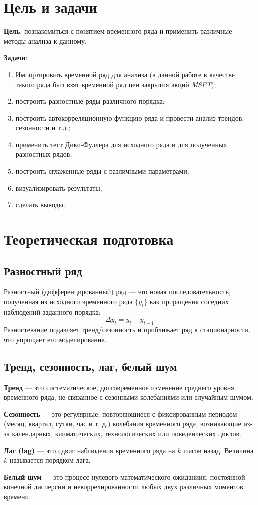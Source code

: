 \documentclass[a4paper, 12pt]{report}
\begin{document}
\section{Цель и задачи}
\textbf{Цель}: познакомиться с понятием временного ряда и применить различные методы анализа к данному. \par
\textbf{Задачи}:
\begin{enumerate}
    \item Импортировать временной ряд для анализа (в данной работе в качестве такого ряда был взят
    временной ряд цен закрытия акций \textit{MSFT});
    \item построить разностные ряды различного порядка;
    \item построить автокорреляционную функцию ряда и провести анализ трендов, сезонности и т.д.;
    \item применить тест Дики-Фуллера для исходного ряда и для полученных разностных рядов;
    \item построить сглаженные ряды с различными параметрами;
    \item визуализировать результаты;
    \item сделать выводы.
\end{enumerate}

\newpage

\section{Теоретическая подготовка}

\subsection{Разностный ряд}
Разностный (дифференцированный) ряд — это новая последовательность, полученная из исходного временного ряда $\{y_t\}$ как приращения соседних наблюдений заданного порядка:
\[\Delta y_t = y_t - y_{t-1} \]
Разностевание подавляет тренд/сезонность и приближает ряд к стационарности, что упрощает его моделирование.

\subsection{Тренд, сезонность, лаг, белый шум}
\textbf{Тренд} — это систематическое, долговременное изменение среднего уровня временного ряда, 
не связанное с сезонными колебаниями или случайным шумом. \par
\textbf{Сезонность} — это регулярные, повторяющиеся с фиксированным периодом 
(месяц, квартал, сутки, час и т. д.) колебания временного ряда, возникающие 
из-за календарных, климатических, технологических или поведенческих циклов. \par
\textbf{Лаг (lag)} — это сдвиг наблюдения временного ряда на $k$ шагов назад. Величина $k$ называется порядком лага. \par
\textbf{Белый шум} — это процесс нулевого математического ожиданиия, постоянной конечной дисперсии и некоррелированности любых двух различных моментов времени.
\end{document}
